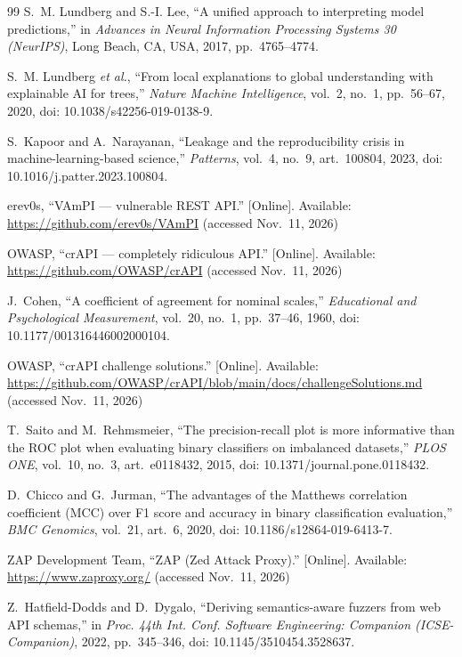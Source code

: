 \documentclass[conference]{IEEEtran}
\begin{document}
\begin{thebibliography}{99}
S.~M. Lundberg and S.-I. Lee, ``A unified approach to interpreting model predictions,'' in
\emph{Advances in Neural Information Processing Systems 30 (NeurIPS)}, Long Beach, CA, USA,
2017, pp.~4765--4774.

S.~M. Lundberg \emph{et al.}, ``From local explanations to global understanding with explainable
{AI} for trees,'' \emph{Nature Machine Intelligence}, vol.~2, no.~1, pp.~56--67, 2020, doi:
10.1038/s42256-019-0138-9.

S.~Kapoor and A.~Narayanan, ``Leakage and the reproducibility crisis in machine-learning-based
science,'' \emph{Patterns}, vol.~4, no.~9, art.~100804, 2023, doi: 10.1016/j.patter.2023.100804.

erev0s, ``VAmPI --- vulnerable REST API.'' [Online]. Available:
\url{https://github.com/erev0s/VAmPI} (accessed Nov.~11, 2026)

OWASP, ``crAPI --- completely ridiculous API.'' [Online]. Available:
\url{https://github.com/OWASP/crAPI} (accessed Nov.~11, 2026)

J.~Cohen, ``A coefficient of agreement for nominal scales,'' \emph{Educational and Psychological
Measurement}, vol.~20, no.~1, pp.~37--46, 1960, doi: 10.1177/001316446002000104.

OWASP, ``crAPI challenge solutions.'' [Online]. Available:
\url{https://github.com/OWASP/crAPI/blob/main/docs/challengeSolutions.md} (accessed Nov.~11, 2026)

T.~Saito and M.~Rehmsmeier, ``The precision-recall plot is more informative than the {ROC} plot
when evaluating binary classifiers on imbalanced datasets,'' \emph{PLOS ONE}, vol.~10, no.~3,
art.~e0118432, 2015, doi: 10.1371/journal.pone.0118432.

D.~Chicco and G.~Jurman, ``The advantages of the {Matthews} correlation coefficient ({MCC}) over
{F1} score and accuracy in binary classification evaluation,'' \emph{BMC Genomics}, vol.~21,
art.~6, 2020, doi: 10.1186/s12864-019-6413-7.


ZAP Development Team, ``ZAP (Zed Attack Proxy).'' [Online]. Available: \url{https://www.zaproxy.org/} (accessed Nov.~11, 2026)

Z.~Hatfield-Dodds and D.~Dygalo, ``Deriving semantics-aware fuzzers from web API schemas,'' in \emph{Proc. 44th Int. Conf. Software Engineering: Companion (ICSE-Companion)}, 2022, pp.~345--346, doi: 10.1145/3510454.3528637.


\end{thebibliography}
\end{document}
